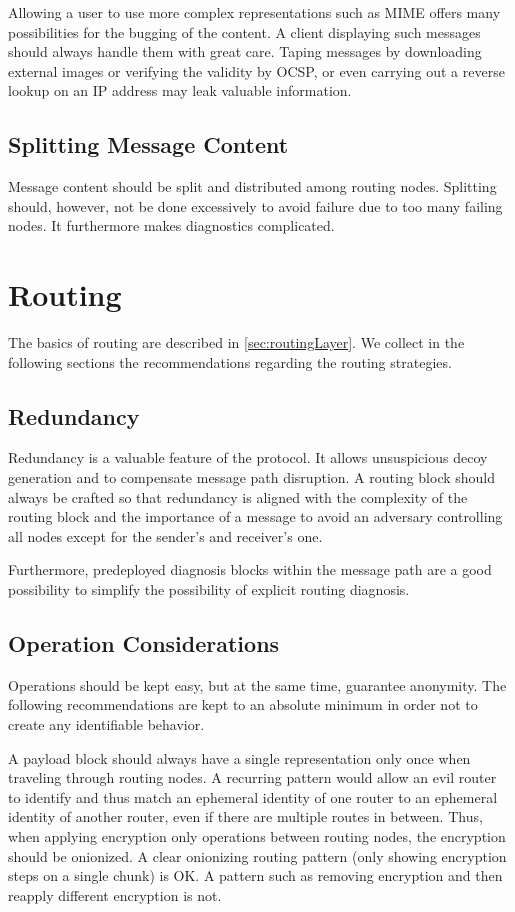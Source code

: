 Allowing a user to use more complex representations such as MIME offers many possibilities for the bugging of the content. A client displaying such messages should always handle them with great care. Taping messages by downloading external images or verifying the validity by OCSP, or even carrying out a reverse lookup on an IP address may leak valuable information.

\subsection{Splitting Message Content}
Message content should be split and distributed among routing nodes. Splitting should, however, not be done excessively to avoid failure due to too many failing nodes. It furthermore makes diagnostics complicated. 

\section{Routing}
The basics of routing are described in \cref{sec:routingLayer}. We collect in the following sections the recommendations regarding the routing strategies.

\subsection{Redundancy}
Redundancy is a valuable feature of the protocol. It allows unsuspicious decoy generation and to compensate message path disruption. A routing block should always be crafted so that redundancy is aligned with the complexity of the routing block and the importance of a message to avoid an adversary controlling all nodes except for the sender's and receiver's one.

Furthermore, predeployed diagnosis blocks within the message path are a good possibility to simplify the possibility of explicit routing diagnosis.

\subsection{Operation Considerations}
Operations should be kept easy, but at the same time, guarantee anonymity. The following recommendations are kept to an absolute minimum in order not to create any identifiable behavior.

A payload block should always have a single representation only once when traveling through routing nodes. A recurring pattern would allow an evil router to identify and thus match an ephemeral identity of one router to an ephemeral identity of another router, even if there are multiple routes in between. Thus, when applying encryption only operations between routing nodes, the encryption should be onionized. A clear onionizing routing pattern (only showing encryption steps on a single chunk) is OK. A pattern such as removing encryption and then reapply different encryption is not.

